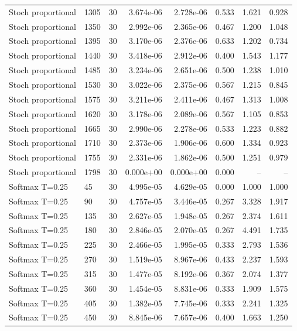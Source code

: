 \begin{scriptsize}
\begin{longtable}{llrrrrrr}
Stoch proportional & 1305 & 30 & 3.674e-06 & 2.728e-06 & 0.533 & 1.621 & 0.928 \\
Stoch proportional & 1350 & 30 & 2.992e-06 & 2.365e-06 & 0.467 & 1.200 & 1.048 \\
Stoch proportional & 1395 & 30 & 3.170e-06 & 2.376e-06 & 0.633 & 1.202 & 0.734 \\
Stoch proportional & 1440 & 30 & 3.418e-06 & 2.912e-06 & 0.400 & 1.543 & 1.177 \\
Stoch proportional & 1485 & 30 & 3.234e-06 & 2.651e-06 & 0.500 & 1.238 & 1.010 \\
Stoch proportional & 1530 & 30 & 3.022e-06 & 2.375e-06 & 0.567 & 1.215 & 0.845 \\
Stoch proportional & 1575 & 30 & 3.211e-06 & 2.411e-06 & 0.467 & 1.313 & 1.008 \\
Stoch proportional & 1620 & 30 & 3.178e-06 & 2.089e-06 & 0.567 & 1.105 & 0.853 \\
Stoch proportional & 1665 & 30 & 2.990e-06 & 2.278e-06 & 0.533 & 1.223 & 0.882 \\
Stoch proportional & 1710 & 30 & 2.373e-06 & 1.906e-06 & 0.600 & 1.334 & 0.923 \\
Stoch proportional & 1755 & 30 & 2.331e-06 & 1.862e-06 & 0.500 & 1.251 & 0.979 \\
Stoch proportional & 1798 & 30 & 0.000e+00 & 0.000e+00 & 0.000 & -- & -- \\
Softmax T=0.25 & 45 & 30 & 4.995e-05 & 4.629e-05 & 0.000 & 1.000 & 1.000 \\
Softmax T=0.25 & 90 & 30 & 4.757e-05 & 3.446e-05 & 0.267 & 3.328 & 1.917 \\
Softmax T=0.25 & 135 & 30 & 2.627e-05 & 1.948e-05 & 0.267 & 2.374 & 1.611 \\
Softmax T=0.25 & 180 & 30 & 2.846e-05 & 2.070e-05 & 0.267 & 4.491 & 1.735 \\
Softmax T=0.25 & 225 & 30 & 2.466e-05 & 1.995e-05 & 0.333 & 2.793 & 1.536 \\
Softmax T=0.25 & 270 & 30 & 1.519e-05 & 8.967e-06 & 0.433 & 2.237 & 1.593 \\
Softmax T=0.25 & 315 & 30 & 1.477e-05 & 8.192e-06 & 0.367 & 2.074 & 1.377 \\
Softmax T=0.25 & 360 & 30 & 1.454e-05 & 8.831e-06 & 0.333 & 1.909 & 1.575 \\
Softmax T=0.25 & 405 & 30 & 1.382e-05 & 7.745e-06 & 0.333 & 2.241 & 1.325 \\
Softmax T=0.25 & 450 & 30 & 8.845e-06 & 7.657e-06 & 0.400 & 1.663 & 1.250 \\

\end{longtable}
\end{scriptsize}
